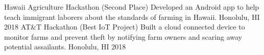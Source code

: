 \begin{cvhonors}
	\cvhonor
		{Hawaii Agriculture Hackathon (Second Place)}
	    {Developed an Android app to help teach immigrant laborers about the standards of farming in Hawaii.}
	    {Honolulu, HI}
	    {2018}  
	\cvhonor
		{AT\&T Hackathon (Best IoT Project)}
	    {Built a cloud connected device to monitor farms and prevent theft by notifying farm owners and scaring away potential assailants.}
	    {Honolulu, HI}
	    {2018}
\end{cvhonors}

